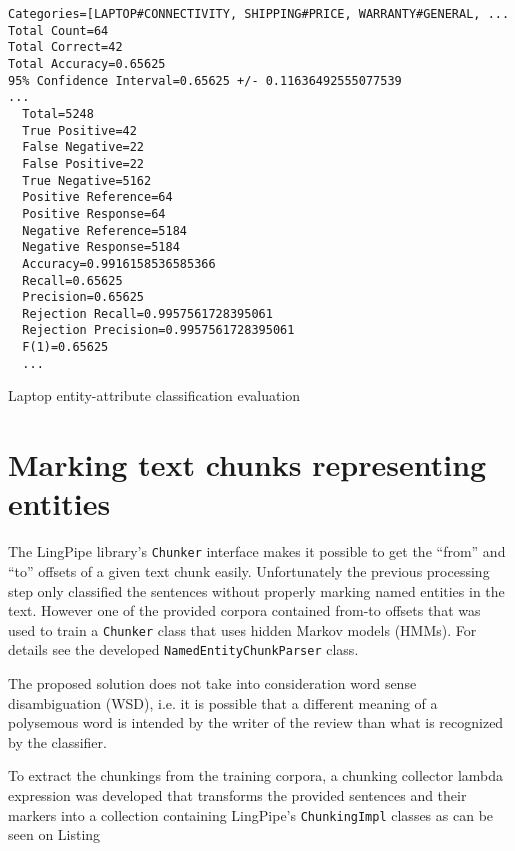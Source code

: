 \begin{listing}
\begin{verbatim}
Categories=[LAPTOP#CONNECTIVITY, SHIPPING#PRICE, WARRANTY#GENERAL, ...
Total Count=64
Total Correct=42
Total Accuracy=0.65625
95% Confidence Interval=0.65625 +/- 0.11636492555077539
...
  Total=5248
  True Positive=42
  False Negative=22
  False Positive=22
  True Negative=5162
  Positive Reference=64
  Positive Response=64
  Negative Reference=5184
  Negative Response=5184
  Accuracy=0.9916158536585366
  Recall=0.65625
  Precision=0.65625
  Rejection Recall=0.9957561728395061
  Rejection Precision=0.9957561728395061
  F(1)=0.65625
  ...
\end{verbatim}
\caption{Laptop entity-attribute classification evaluation}
\label{lst:classificationEvaluationLaptop}
\end{listing}

\section*{Marking text chunks representing entities}
The LingPipe library's \verb+Chunker+ interface makes it
possible to get the ``from'' and ``to'' offsets of a given text chunk easily.
Unfortunately the previous processing step only classified the sentences without
properly marking named entities in the text. However one of the provided corpora
contained from-to offsets that was used to train a \verb|Chunker| class that
uses hidden Markov models (HMMs). For details see the developed
\verb|NamedEntityChunkParser| class.

The proposed solution does not take into consideration word sense
disambiguation (WSD), i.e. it is possible that a different meaning of a
polysemous word is intended by the writer of the review than what is recognized by the
classifier.

To extract the chunkings from the training corpora, a chunking collector lambda
expression was developed that transforms the provided sentences and their
markers into a collection containing LingPipe's \verb|ChunkingImpl| classes as
can be seen on Listing 


